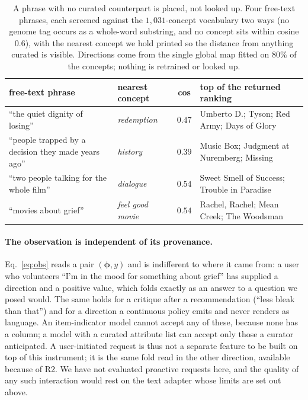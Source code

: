 \documentclass[manuscript,screen]{acmart}
\newcommand{\bphi}{\boldsymbol{\phi}}
\begin{document}
\begin{table}[t]\centering\small
\setlength{\tabcolsep}{5pt}
\begin{tabular}{p{4.2cm}p{2.0cm}c p{5.4cm}}
\toprule
free-text phrase & nearest concept & cos & top of the returned ranking \\
\midrule
``the quiet dignity of losing'' & \emph{redemption} & $0.47$ & Umberto D.; Tyson; Red Army; Days of Glory \\
``people trapped by a decision they made years ago'' & \emph{history} & $0.39$ & Music Box; Judgment at Nuremberg; Missing \\
``two people talking for the whole film'' & \emph{dialogue} & $0.54$ & Sweet Smell of Success; Trouble in Paradise \\
``movies about grief'' & \emph{feel good movie} & $0.54$ & Rachel, Rachel; Mean Creek; The Woodsman \\
\bottomrule
\end{tabular}
\caption{A phrase with no curated counterpart is placed, not looked up. Four free-text phrases, each screened against the $1{,}031$-concept vocabulary two ways (no genome tag occurs as a whole-word substring, and no concept sits within cosine $0.6$), with the nearest concept we hold printed so the distance from anything curated is visible. Directions come from the single global map fitted on $80\%$ of the concepts; nothing is retrained or looked up.}
\label{tab:freetext}
\end{table}

\paragraph{The observation is independent of its provenance.} Eq.~\eqref{eq:obs} reads a pair $(\bphi,y)$ and is indifferent to where it came from: a user who volunteers ``I'm in the mood for something about grief'' has supplied a direction and a positive value, which folds exactly as an answer to a question we posed would. The same holds for a critique after a recommendation (``less bleak than that'') and for a direction a continuous policy emits and never renders as language. An item-indicator model cannot accept any of these, because none has a column; a model with a curated attribute list can accept only those a curator anticipated. A user-initiated request is thus not a separate feature to be built on top of this instrument; it is the same fold read in the other direction, available because of R2. We have not evaluated proactive requests here, and the quality of any such interaction would rest on the text adapter whose limits are set out above.
\end{document}
